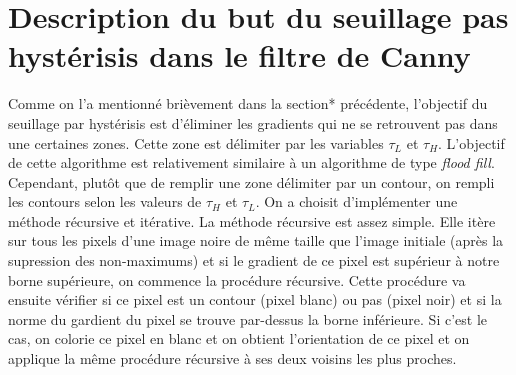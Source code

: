 \documentclass{article}
\begin{document}
\section*{Description du but du seuillage pas hystérisis dans le filtre de Canny}
Comme on l'a mentionné brièvement dans la section* précédente, l'objectif du seuillage par hystérisis est d'éliminer les gradients qui ne se
retrouvent pas dans une certaines zones. Cette zone est délimiter par les variables $\tau_L$ et $\tau_H$. L'objectif de cette algorithme est relativement 
similaire à un algorithme de type \textit{flood fill}. Cependant, plutôt que de remplir une zone délimiter par un contour, on rempli les contours selon
les valeurs de $\tau_H$ et $\tau_L$. On a choisit d'implémenter une méthode récursive et itérative. La méthode récursive est assez simple. Elle itère sur tous
les pixels d'une image noire de même taille que l'image initiale (après la supression des non-maximums) et si le gradient de ce pixel est supérieur à notre borne
supérieure, on commence la procédure récursive. Cette procédure va ensuite vérifier si ce pixel est un contour (pixel blanc) ou pas (pixel noir) et si
la norme du gardient du pixel se trouve par-dessus la borne inférieure. Si c'est le cas, on colorie ce pixel en blanc et on obtient l'orientation 
de ce pixel et on applique la même procédure récursive à ses deux voisins les plus proches.
\end{document}
